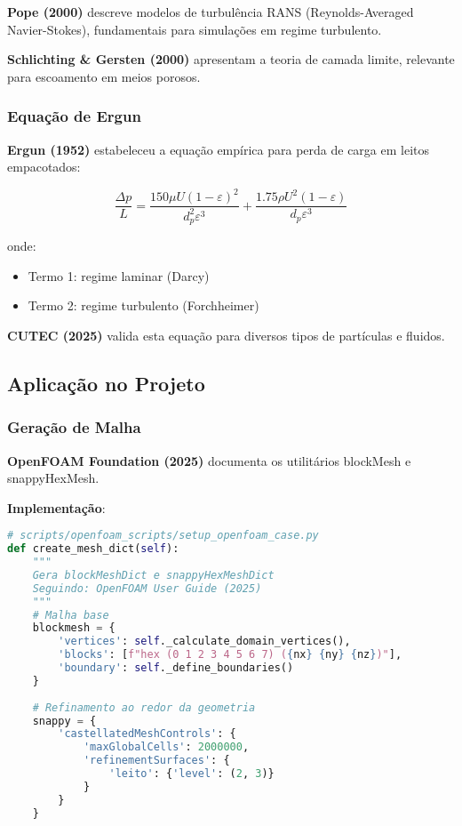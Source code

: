 \documentclass[12pt,a4paper]{article}
\begin{document}
\textbf{Pope (2000)} descreve modelos de turbulência RANS (Reynolds-Averaged Navier-Stokes), fundamentais para simulações em regime turbulento.

\textbf{Schlichting \& Gersten (2000)} apresentam a teoria de camada limite, relevante para escoamento em meios porosos.

\subsubsection{Equação de Ergun}

\textbf{Ergun (1952)} estabeleceu a equação empírica para perda de carga em leitos empacotados:

\begin{equation}
\frac{\Delta p}{L} = \frac{150 \mu U (1-\varepsilon)^2}{d_p^2 \varepsilon^3} + \frac{1.75 \rho U^2 (1-\varepsilon)}{d_p \varepsilon^3}
\end{equation}

onde:
\begin{itemize}
    \item Termo 1: regime laminar (Darcy)
    \item Termo 2: regime turbulento (Forchheimer)
\end{itemize}

\textbf{CUTEC (2025)} valida esta equação para diversos tipos de partículas e fluidos.

\subsection{Aplicação no Projeto}

\subsubsection{Geração de Malha}

\textbf{OpenFOAM Foundation (2025)} documenta os utilitários blockMesh e snappyHexMesh.

\textbf{Implementação}:
\begin{lstlisting}[language=Python, caption=Geração de malha OpenFOAM]
# scripts/openfoam_scripts/setup_openfoam_case.py
def create_mesh_dict(self):
    """
    Gera blockMeshDict e snappyHexMeshDict
    Seguindo: OpenFOAM User Guide (2025)
    """
    # Malha base
    blockmesh = {
        'vertices': self._calculate_domain_vertices(),
        'blocks': [f"hex (0 1 2 3 4 5 6 7) ({nx} {ny} {nz})"],
        'boundary': self._define_boundaries()
    }
    
    # Refinamento ao redor da geometria
    snappy = {
        'castellatedMeshControls': {
            'maxGlobalCells': 2000000,
            'refinementSurfaces': {
                'leito': {'level': (2, 3)}
            }
        }
    }
\end{lstlisting}
\end{document}
